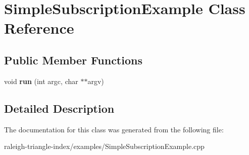 \section{Simple\+Subscription\+Example Class Reference}
\label{class_simple_subscription_example}
\subsection*{Public Member Functions}
\begin{DoxyCompactItemize}
\item 
void {\bfseries run} (int argc, char $\ast$$\ast$argv)\label{class_simple_subscription_example_ad6cd71499b652f8395b4b323899cc460}

\end{DoxyCompactItemize}


\subsection{Detailed Description}


The documentation for this class was generated from the following file\+:\begin{DoxyCompactItemize}
\item 
raleigh-\/triangle-\/index/examples/Simple\+Subscription\+Example.\+cpp\end{DoxyCompactItemize}

